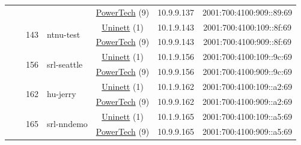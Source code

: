 \begin{small}
\begin{center}
\begin{longtable}{|c|c|c|c|c|c|c|c|}
  &  &  &  & \multicolumn{2}{|c|}{\tiny{\href{http://www.powertech.no}{PowerTech} (9)}} & \tiny{10.9.9.137} & \tiny{2001:700:4100:909::89:69} \\* \cline{3-3}\cline{4-4}\cline{5-5}\cline{6-6}\cline{7-7}\cline{8-8}
  &  & \multirow{2}{*}{\tiny{143}} & \multicolumn{1}{|l|}{\multirow{2}{*}{\tiny{ntnu-test}}} & \multicolumn{2}{|c|}{\tiny{\href{https://www.uninett.no}{Uninett} (1)}} & \tiny{10.1.9.143} & \tiny{2001:700:4100:109::8f:69} \\* \cline{5-5}\cline{6-6}\cline{7-7}\cline{8-8}
  &  &  &  & \multicolumn{2}{|c|}{\tiny{\href{http://www.powertech.no}{PowerTech} (9)}} & \tiny{10.9.9.143} & \tiny{2001:700:4100:909::8f:69} \\* \cline{3-3}\cline{4-4}\cline{5-5}\cline{6-6}\cline{7-7}\cline{8-8}
  &  & \multirow{2}{*}{\tiny{156}} & \multicolumn{1}{|l|}{\multirow{2}{*}{\tiny{srl-seattle}}} & \multicolumn{2}{|c|}{\tiny{\href{https://www.uninett.no}{Uninett} (1)}} & \tiny{10.1.9.156} & \tiny{2001:700:4100:109::9c:69} \\* \cline{5-5}\cline{6-6}\cline{7-7}\cline{8-8}
  &  &  &  & \multicolumn{2}{|c|}{\tiny{\href{http://www.powertech.no}{PowerTech} (9)}} & \tiny{10.9.9.156} & \tiny{2001:700:4100:909::9c:69} \\* \cline{3-3}\cline{4-4}\cline{5-5}\cline{6-6}\cline{7-7}\cline{8-8}
  &  & \multirow{2}{*}{\tiny{162}} & \multicolumn{1}{|l|}{\multirow{2}{*}{\tiny{hu-jerry}}} & \multicolumn{2}{|c|}{\tiny{\href{https://www.uninett.no}{Uninett} (1)}} & \tiny{10.1.9.162} & \tiny{2001:700:4100:109::a2:69} \\* \cline{5-5}\cline{6-6}\cline{7-7}\cline{8-8}
  &  &  &  & \multicolumn{2}{|c|}{\tiny{\href{http://www.powertech.no}{PowerTech} (9)}} & \tiny{10.9.9.162} & \tiny{2001:700:4100:909::a2:69} \\* \cline{3-3}\cline{4-4}\cline{5-5}\cline{6-6}\cline{7-7}\cline{8-8}
  &  & \multirow{2}{*}{\tiny{165}} & \multicolumn{1}{|l|}{\multirow{2}{*}{\tiny{srl-nndemo}}} & \multicolumn{2}{|c|}{\tiny{\href{https://www.uninett.no}{Uninett} (1)}} & \tiny{10.1.9.165} & \tiny{2001:700:4100:109::a5:69} \\* \cline{5-5}\cline{6-6}\cline{7-7}\cline{8-8}
  &  &  &  & \multicolumn{2}{|c|}{\tiny{\href{http://www.powertech.no}{PowerTech} (9)}} & \tiny{10.9.9.165} & \tiny{2001:700:4100:909::a5:69} \\ \hline
\end{longtable}
\end{center}
\end{small}



